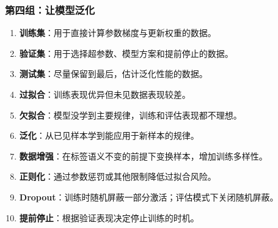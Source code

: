 \subsubsection{第四组：让模型泛化}
\begin{enumerate}[leftmargin=2.5em,itemsep=4pt,start=31]
\item \textbf{训练集}：用于直接计算参数梯度与更新权重的数据。 
\item \textbf{验证集}：用于选择超参数、模型方案和提前停止的数据。 
\item \textbf{测试集}：尽量保留到最后，估计泛化性能的数据。 
\item \textbf{过拟合}：训练表现优异但未见数据表现较差。 
\item \textbf{欠拟合}：模型没学到主要规律，训练和评估表现都不理想。 
\item \textbf{泛化}：从已见样本学到能应用于新样本的规律。 
\item \textbf{数据增强}：在标签语义不变的前提下变换样本，增加训练多样性。 
\item \textbf{正则化}：通过参数惩罚或其他限制降低过拟合风险。 
\item \textbf{Dropout}：训练时随机屏蔽一部分激活；评估模式下关闭随机屏蔽。 
\item \textbf{提前停止}：根据验证表现决定停止训练的时机。 
\end{enumerate}

